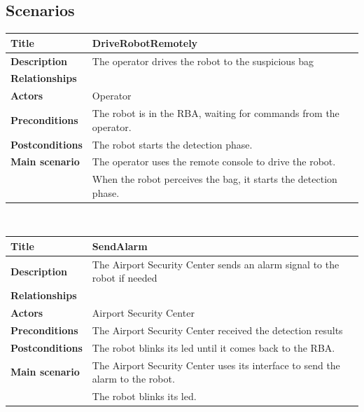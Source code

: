 \documentclass{llncs}
\newcommand{\labelssec}[1]{\label{ssec:#1}}
\begin{document}
\subsection{Scenarios}
\labelssec{Scenarios}
\begin{tabular}{| l | l |}
	\hline
	\textbf{Title} & DriveRobotRemotely
	\\ \hline
	\textbf{Description}  & The operator drives the robot to the suspicious bag
	\\ \hline
	\textbf{Relationships} & 
	\\ \hline
	\textbf{Actors} & Operator
	\\ \hline
	\textbf{Preconditions} & The robot is in the RBA, waiting for commands from the operator.
	\\ \hline
	\textbf{Postconditions} & The robot starts the detection phase.
	\\ \hline
	\textbf{Main scenario} & The operator uses the remote console to drive the robot. \\ &
	When the robot perceives the bag, it starts the detection phase.
	\\ \hline
\end{tabular}
\\
\begin{tabular}{| l | l |}
	\hline
	\textbf{Title} & SendAlarm
	\\ \hline
	\textbf{Description}  & The Airport Security Center sends an alarm signal to the robot if needed
	\\ \hline
	\textbf{Relationships} & 
	\\ \hline
	\textbf{Actors} & Airport Security Center
	\\ \hline
	\textbf{Preconditions} & The Airport Security Center received the detection results
	\\ \hline
	\textbf{Postconditions} & The robot blinks its led until it comes back to the RBA.
	\\ \hline
	\textbf{Main scenario} & 
	The Airport Security Center uses its interface to send the alarm to the robot. \\ &
	The robot blinks its led.
	\\ \hline
\end{tabular}

\end{document}
